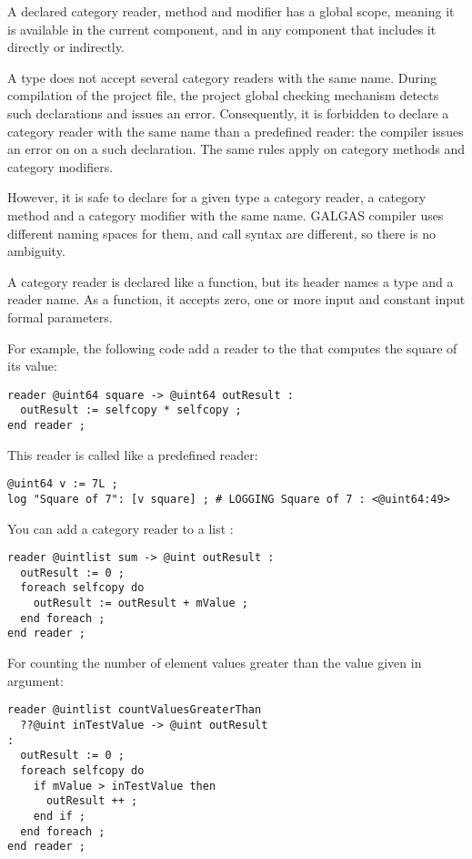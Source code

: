 A declared category reader, method and modifier has a global scope, meaning it is available in the current component, and in any component that includes it directly or indirectly.

A type does not accept several category readers with the same name. During compilation of the project file, the project global checking mechanism detects such declarations and issues an error. Consequently, it is forbidden to declare a category reader with the same name than a predefined reader: the compiler issues an error on on a such declaration. The same rules apply on category methods and category modifiers.

However, it is safe to declare for a given type a category reader, a category method and a category modifier with the same name. GALGAS compiler uses different naming spaces for them, and call syntax are different, so there is no ambiguity.











A category reader is declared like a function, but its header names a type and a reader name. As a function, it accepts zero, one or more input and constant input formal parameters.

For example, the following code add a reader to the  that computes the square of its value:
\begin{lstlisting}[language=galgas]
reader @uint64 square -> @uint64 outResult :
  outResult := selfcopy * selfcopy ;
end reader ;
\end{lstlisting}

This reader is called like a predefined reader:
\begin{lstlisting}[language=galgas]
@uint64 v := 7L ;
log "Square of 7": [v square] ; # LOGGING Square of 7 : <@uint64:49>
\end{lstlisting}

You can add a category reader to a list :
\begin{lstlisting}[language=galgas]
reader @uintlist sum -> @uint outResult :
  outResult := 0 ;
  foreach selfcopy do
    outResult := outResult + mValue ;
  end foreach ;
end reader ;
\end{lstlisting}

For counting the number of element values greater than the value given in argument:
\begin{lstlisting}[language=galgas]
reader @uintlist countValuesGreaterThan
  ??@uint inTestValue -> @uint outResult
:
  outResult := 0 ;
  foreach selfcopy do
    if mValue > inTestValue then
      outResult ++ ;
    end if ;
  end foreach ;
end reader ;
\end{lstlisting}

